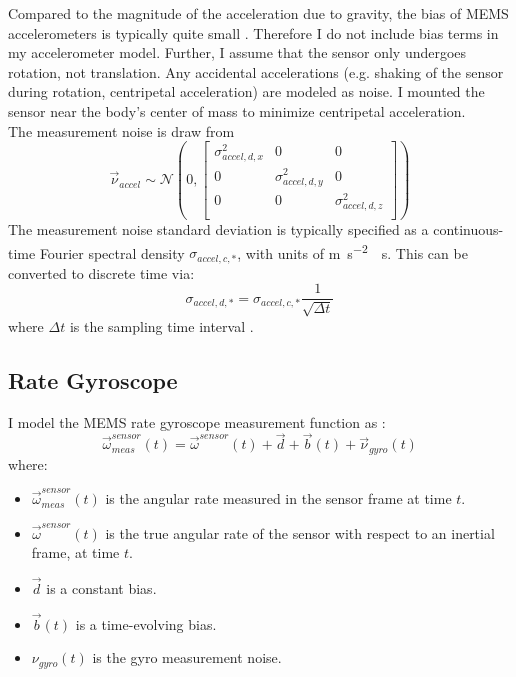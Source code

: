 \documentclass[conference]{IEEEtran}
\begin{document}
Compared to the magnitude of the acceleration due to gravity, the bias of MEMS accelerometers is typically quite small \cite{mpu9150, UCAM-CL-TR-696}. Therefore I do not include bias terms in my accelerometer model. Further, I assume that the sensor only undergoes rotation, not translation. Any accidental accelerations (e.g. shaking of the sensor during rotation, centripetal acceleration) are modeled as noise. I mounted the sensor near the body's center of mass to minimize centripetal acceleration.\\

The measurement noise is draw from
\begin{equation}
  \vec{\nu}_{accel} \sim \mathcal{N}(0,
  \begin{bmatrix}
    \sigma_{accel,d,x}^2 & 0 & 0 \\
     0 & \sigma_{accel,d,y}^2 & 0 \\
     0 & 0 & \sigma_{accel,d,z}^2 \\
    \end{bmatrix}
  )
\end{equation}
The measurement noise standard deviation is typically specified as a continuous-time Fourier spectral density $\sigma_{accel,c,*}$, with units of \si{\meter\per\second\squared\sqrt\second}. This can be converted to discrete time via:
\begin{equation}
  \label{eqn:cont_to_desc_noise}
  \sigma_{accel,d,*} = \sigma_{accel,c,*} \frac{1}{\sqrt{\Delta t}}
\end{equation}
where $\Delta t$ is the sampling time interval \cite{1642588}.


\subsection{Rate Gyroscope}
I model the MEMS rate gyroscope measurement function as \cite{1642588}:
\begin{equation}
  \vec{\omega}_{meas}^{sensor}(t) = \vec{\omega}^{sensor}(t) + \vec{d} + \vec{b}(t) + \vec{\nu}_{gyro}(t)
\end{equation}
where:
\begin{itemize}
  \item $\vec{\omega}_{meas}^{sensor}(t)$ is the angular rate measured in the sensor frame at time $t$.
  \item $\vec{\omega}^{sensor}(t)$ is the true angular rate of the sensor with respect to an inertial frame, at time $t$.
  \item $\vec{d}$ is a constant bias.
  \item $\vec{b}(t)$ is a time-evolving bias.
  \item $\nu_{gyro}(t)$ is the gyro measurement noise.
\end{itemize}
\end{document}
